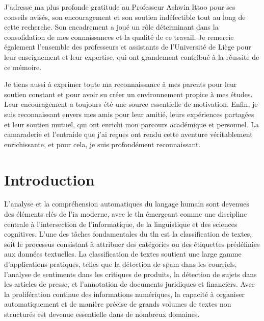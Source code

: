 \documentclass[12pt]{report}
\begin{document}
J’adresse ma plus profonde gratitude au Professeur Ashwin Ittoo pour ses conseils avisés, son encouragement et son soutien indéfectible tout au long de cette recherche. Son encadrement a joué un rôle déterminant dans la consolidation de mes connaissances et la qualité de ce travail. Je remercie également l’ensemble des professeurs et assistants de l’Université de Liège pour leur enseignement et leur expertise, qui ont grandement contribué à la réussite de ce mémoire.

Je tiens aussi à exprimer toute ma reconnaissance à mes parents pour leur soutien constant et pour avoir su créer un environnement propice à mes études. Leur encouragement a toujours été une source essentielle de motivation. Enfin, je suis reconnaissant envers mes amis pour leur amitié, leurs expériences partagées et leur soutien mutuel, qui ont enrichi mon parcours académique et personnel. La camaraderie et l'entraide que j’ai reçues ont rendu cette aventure véritablement enrichissante, et pour cela, je suis profondément reconnaissant.

\newpage

\tableofcontents  %
\newpage

\printglossary[type=\acronymtype]


\newpage

\chapter{Introduction}

L’analyse et la compréhension automatiques du langage humain sont devenues des éléments clés de l’\gls{ia} moderne, avec le \gls{tln} émergeant comme une discipline centrale à l’intersection de l’informatique, de la linguistique et des sciences cognitives. L’une des tâches fondamentales du \gls{tln} est la classification de textes, soit le processus consistant à attribuer des catégories ou des étiquettes prédéfinies aux données textuelles. La classification de textes soutient une large gamme d’applications pratiques, telles que la détection de spam dans les courriels, l’analyse de sentiments dans les critiques de produits, la détection de sujets dans les articles de presse, et l’annotation de documents juridiques et financiers. Avec la prolifération continue des informations numériques, la capacité à organiser automatiquement et de manière précise de grands volumes de textes non structurés est devenue essentielle dans de nombreux domaines. 
\end{document}
